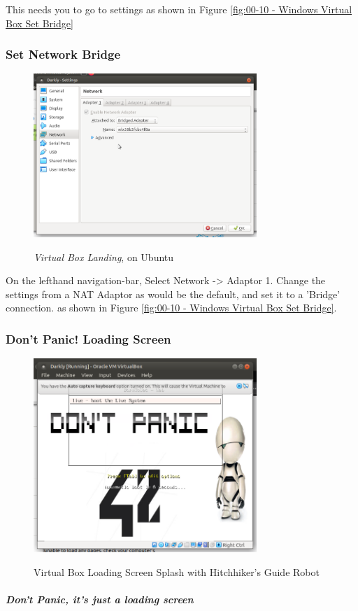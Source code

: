 This needs you to go to settings as shown in Figure \vref{fig:00-10 - Windows Virtual Box Set Bridge}

\subsubsection{Set Network Bridge}

\begin{figure}[!htb]
    \centering
    \includegraphics[width=0.752\textwidth]{images/00-10.png}\\[0cm]  
    \caption[Windows Virtual Box]{\emph{Virtual Box Landing}, on Ubuntu}
    \label{fig:00-10 - Windows Virtual Box Set Bridge} 
\end{figure}
On the lefthand navigation-bar, Select Network -> Adaptor 1.
Change the settings from a NAT Adaptor as would be the default, and set it
to a 'Bridge' connection. as shown in Figure \vref{fig:00-10 - Windows Virtual Box Set Bridge}.

\subsubsection{Don't Panic! Loading Screen}

\begin{figure}[!htb]
    \centering
    \includegraphics[width=0.752\textwidth]{images/00-11.png}\\[0cm]  
    \caption[Windows Virtual Box]{Virtual Box Loading Screen Splash with Hitchhiker's Guide Robot}
    \label{fig:00-11 - Windows Virtual Box LoadingScreen1} 
\end{figure}
\subparagraph{Don't Panic, it's just a loading screen}

